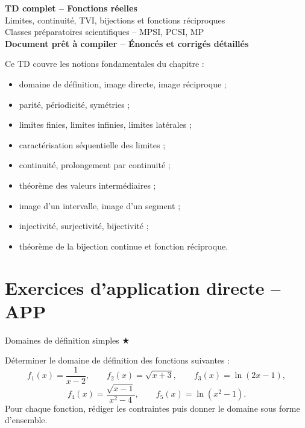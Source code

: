 \documentclass[11pt,a4paper]{article}
\newcounter{exo}
\newcounter{corr}
\newcommand{\etoiles}[1]{\hfill{\small\textcolor{orangeprepa}{#1}}}
\newcommand{\exercice}[2]{
  \refstepcounter{exo}
  \begin{exercicebox}{\theexo}{#1}
  #2
  \end{exercicebox}
}
\begin{document}
\begin{center}
{\Huge \bfseries TD complet -- Fonctions réelles}\\[0.2cm]
{\Large Limites, continuité, TVI, bijections et fonctions réciproques}\\[0.2cm]
{\large Classes préparatoires scientifiques -- MPSI, PCSI, MP}\\[0.25cm]
\textbf{Document prêt à compiler -- Énoncés et corrigés détaillés}
\end{center}

\vspace{0.3cm}

\begin{tcolorbox}[colframe=rougeprepa,colback=red!2!white,title={Objectifs du TD}]
Ce TD couvre les notions fondamentales du chapitre :
\begin{itemize}
  \item domaine de définition, image directe, image réciproque ;
  \item parité, périodicité, symétries ;
  \item limites finies, limites infinies, limites latérales ;
  \item caractérisation séquentielle des limites ;
  \item continuité, prolongement par continuité ;
  \item théorème des valeurs intermédiaires ;
  \item image d'un intervalle, image d'un segment ;
  \item injectivité, surjectivité, bijectivité ;
  \item théorème de la bijection continue et fonction réciproque.
\end{itemize}
\end{tcolorbox}

\tableofcontents
\newpage

\section{Exercices d'application directe -- APP}

\exercice{Domaines de définition simples \etoiles{★}}{
Déterminer le domaine de définition des fonctions suivantes :
\[
f_1(x)=\frac{1}{x-2},\qquad
f_2(x)=\sqrt{x+3},\qquad
f_3(x)=\ln(2x-1),
\]
\[
f_4(x)=\frac{\sqrt{x-1}}{x^2-4},\qquad
f_5(x)=\ln(x^2-1).
\]
Pour chaque fonction, rédiger les contraintes puis donner le domaine sous forme d'ensemble.
}
\end{document}
